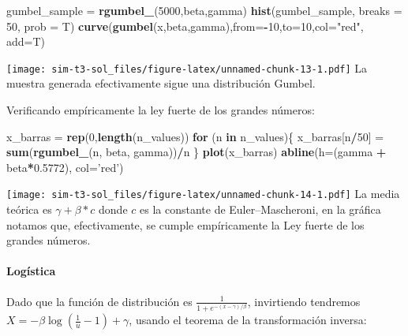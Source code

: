 \documentclass[]{article}
\newenvironment{Shaded}{\begin{snugshade}}{\end{snugshade}}
\newcommand{\ControlFlowTok}[1]{\textcolor[rgb]{0.13,0.29,0.53}{\textbf{#1}}}
\newcommand{\DataTypeTok}[1]{\textcolor[rgb]{0.13,0.29,0.53}{#1}}
\newcommand{\DecValTok}[1]{\textcolor[rgb]{0.00,0.00,0.81}{#1}}
\newcommand{\FloatTok}[1]{\textcolor[rgb]{0.00,0.00,0.81}{#1}}
\newcommand{\KeywordTok}[1]{\textcolor[rgb]{0.13,0.29,0.53}{\textbf{#1}}}
\newcommand{\NormalTok}[1]{#1}
\newcommand{\OperatorTok}[1]{\textcolor[rgb]{0.81,0.36,0.00}{\textbf{#1}}}
\newcommand{\StringTok}[1]{\textcolor[rgb]{0.31,0.60,0.02}{#1}}
\let\oldparagraph\paragraph
\renewcommand{\paragraph}[1]{\oldparagraph{#1}\mbox{}}
\begin{document}
\begin{Shaded}
\begin{Highlighting}[]
\NormalTok{gumbel_sample =}\StringTok{ }\KeywordTok{rgumbel_}\NormalTok{(}\DecValTok{5000}\NormalTok{,beta,gamma)}
\KeywordTok{hist}\NormalTok{(gumbel_sample, }\DataTypeTok{breaks =} \DecValTok{50}\NormalTok{, }\DataTypeTok{prob =}\NormalTok{ T)}
\KeywordTok{curve}\NormalTok{(}\KeywordTok{gumbel}\NormalTok{(x,beta,gamma),}\DataTypeTok{from=}\OperatorTok{-}\DecValTok{10}\NormalTok{,}\DataTypeTok{to=}\DecValTok{10}\NormalTok{,}\DataTypeTok{col=}\StringTok{"red"}\NormalTok{, }\DataTypeTok{add=}\NormalTok{T)}
\end{Highlighting}
\end{Shaded}

\texttt{[image: sim-t3-sol\_files/figure-latex/unnamed-chunk-13-1.pdf]}
La muestra generada efectivamente sigue una distribución Gumbel.

Verificando empíricamente la ley fuerte de los grandes números:

\begin{Shaded}
\begin{Highlighting}[]
\NormalTok{x_barras =}\StringTok{ }\KeywordTok{rep}\NormalTok{(}\DecValTok{0}\NormalTok{,}\KeywordTok{length}\NormalTok{(n_values))}
\ControlFlowTok{for}\NormalTok{ (n }\ControlFlowTok{in}\NormalTok{ n_values)\{}
\NormalTok{  x_barras[n}\OperatorTok{/}\DecValTok{50}\NormalTok{] =}\StringTok{ }\KeywordTok{sum}\NormalTok{(}\KeywordTok{rgumbel_}\NormalTok{(n, beta, gamma))}\OperatorTok{/}\NormalTok{n}
\NormalTok{\}}
\KeywordTok{plot}\NormalTok{(x_barras)}
\KeywordTok{abline}\NormalTok{(}\DataTypeTok{h=}\NormalTok{(gamma }\OperatorTok{+}\StringTok{ }\NormalTok{beta}\OperatorTok{*}\FloatTok{0.5772}\NormalTok{), }\DataTypeTok{col=}\StringTok{'red'}\NormalTok{)}
\end{Highlighting}
\end{Shaded}

\texttt{[image: sim-t3-sol\_files/figure-latex/unnamed-chunk-14-1.pdf]}
La media teórica es \(\gamma + \beta*c\) donde \(c\) es la constante de
Euler--Mascheroni, en la gráfica notamos que, efectivamente, se cumple
empíricamente la Ley fuerte de los grandes números.

\hypertarget{logistica}{%
\paragraph{Logística}\label{logistica}}

Dado que la función de distribución es
\(\frac{1}{1+e^{-(x-\gamma)/\beta}}\), invirtiendo tendremos
\(X = -\beta \log(\frac{1}{u} -1) + \gamma\), usando el teorema de la
transformación inversa:
\end{document}
